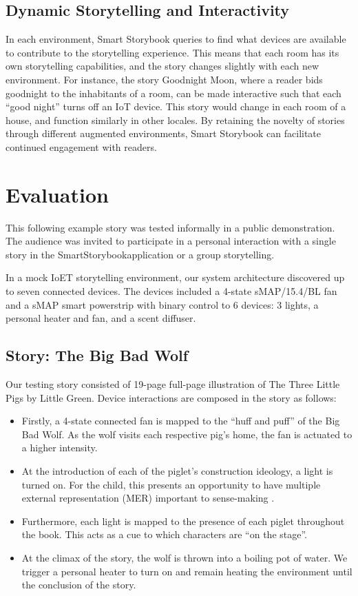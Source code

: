 \documentclass{sigchi}
\newcommand\name{SmartStorybook}
\begin{document}
\subsection{Dynamic Storytelling and Interactivity}
In each environment, Smart Storybook queries to find what devices are available to contribute to the storytelling experience. This means that each room has its own storytelling capabilities, and the story changes slightly with each new environment. For instance, the story Goodnight Moon, where a reader bids goodnight to the inhabitants of a room, can be made interactive such that each ``good night'' turns off an IoT device. This story would change in each room of a house, and function similarly in other locales. By retaining the novelty of stories through different augmented environments, Smart Storybook can facilitate continued engagement with readers. 




\section{Evaluation}
This following example story was tested informally in a public demonstration. The audience was invited to participate in a personal interaction with a single story in the \name application or a group storytelling. 

In a mock IoET storytelling environment, our system architecture discovered up to seven connected devices. The devices included a 4-state sMAP/15.4/BL fan and a sMAP smart powerstrip with binary control to 6 devices: 3 lights, a personal heater and fan, and a scent diffuser.  

\subsection{Story: The Big Bad Wolf}
Our testing story consisted of 19-page full-page illustration of The Three Little Pigs by Little Green. Device interactions are composed in the story as follows:
\begin{itemize}
\item Firstly, a 4-state connected fan is mapped to the ``huff and puff'' of the Big Bad Wolf. As the wolf visits each respective pig's home, the fan is actuated to a higher intensity. 
\item At the introduction of each of the piglet's construction ideology, a light is turned on. For the child, this presents an opportunity to have multiple external representation (MER) important to sense-making \cite{ainsworth_deft:_2006}. 
\item Furthermore, each light is mapped to the presence of each piglet throughout the book. This acts as a cue to which characters are ``on the stage''. 
\item At the climax of the story, the wolf is thrown into a boiling pot of water. We trigger a personal heater to turn on and remain heating the environment until the conclusion of the story. 
\end{itemize}
\end{document}
